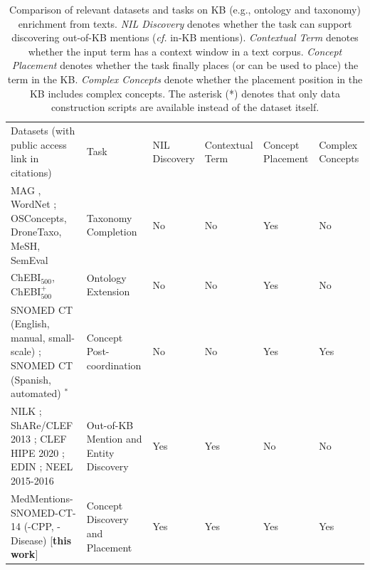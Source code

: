 \documentclass[sigconf]{acmart}
\begin{document}
\begin{table}[ht]
\small
\caption{Comparison of relevant datasets and tasks on KB (e.g., ontology and taxonomy) enrichment from texts. \textit{NIL Discovery} denotes whether the task can support discovering out-of-KB mentions (\textit{cf.} in-KB mentions). \textit{Contextual Term} denotes whether the input term has a context window in a text corpus. \textit{Concept Placement} denotes whether the task finally places (or can be used to place) the term in the KB. \textit{Complex Concepts} denote whether the placement position in the KB includes complex concepts. The asterisk (*) denotes that only data construction scripts are available instead of the dataset itself. }\label{dataset-summary}
\vspace{-0.2cm}
\begin{tabular}{p{5.2cm}p{2.4cm}|llll}
\cline{1-6}
Datasets (with public access link in citations) & Task                & NIL Discovery & Contextual Term  & Concept Placement  & Complex Concepts \\
\cline{1-6}
MAG
, WordNet 
\cite{zhang2021TMN,Shen2020TaxoExpan,jurgens-pilehvar-2016-semeval}; OSConcepts, DroneTaxo, MeSH, SemEval 
\cite{Zeng2021,Wang2022QEN}                     & Taxonomy Completion                              & No                 & No                & Yes & No                  \\ 
\cline{1-6}
ChEBI$_{500}$, ChEBI$^+_{500}$ \cite{glauer2022interpretable} & Ontology Extension
& No                 & No & Yes & No                  \\ \cline{1-6}
SNOMED CT (English, manual, small-scale) \cite{kate2020}; SNOMED CT (Spanish, automated) \cite{castell2023postcoordination}$^*$                     & Concept Post-coordination                        &   No                 & No   & Yes               & Yes                  \\ 
\cline{1-6}
NILK \cite{Iurshina2022nilk}; ShARe/CLEF 2013 \cite{suominen2013shareclef}; CLEF HIPE 2020 \cite{ehrmann2020extended}; EDIN \cite{kassner2022edin}; NEEL 2015-2016 \cite{rizzo2015neel,rizzo2016neel}
                    & Out-of-KB Mention and Entity Discovery &   Yes              & Yes  & No                & No                   \\
\hline\hline 
MedMentions-SNOMED-CT-14 (-CPP, -Disease) [\textbf{this work}]                     & Concept Discovery and Placement                             &  Yes                & Yes               & Yes  & Yes                
 \\
\cline{1-6}
\end{tabular}
\end{table}
\end{document}
